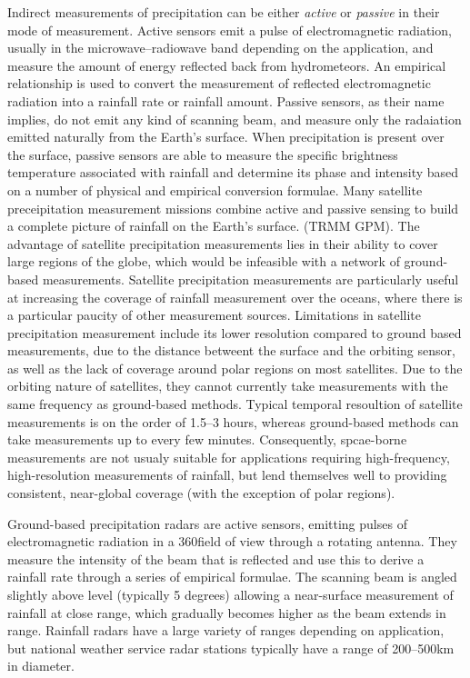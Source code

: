 Indirect measurements of precipitation can be either \textit{active} or \textit{passive} in their mode of measurement. Active sensors emit a pulse of electromagnetic radiation, usually in the microwave--radiowave band depending on the application, and measure the amount of energy reflected back from hydrometeors. An empirical relationship is used to convert the measurement of reflected electromagnetic radiation into a rainfall rate or rainfall amount. Passive sensors, as their name implies, do not emit any kind of scanning beam, and measure only the radaiation emitted naturally from the Earth's surface. When precipitation is present over the surface, passive sensors are able to measure the specific brightness temperature associated with rainfall and determine its phase and intensity based on a number of physical and empirical conversion formulae. Many satellite preceipitation measurement missions combine active and passive sensing to build a complete picture of rainfall on the Earth's surface. (TRMM GPM). The advantage of satellite precipitation measurements lies in their ability to cover large regions of the globe, which would be infeasible with a network of ground-based measurements. Satellite precipitation measurements are particularly useful at increasing the coverage of rainfall measurement over the oceans, where there is a particular paucity of other measurement sources. Limitations in satellite precipitation measurement include its lower resolution compared to ground based measurements, due to the distance betweent the surface and the orbiting sensor, as well as the lack of coverage around polar regions on most satellites. Due to the orbiting nature of satellites, they cannot currently take measurements with the same frequency as ground-based methods. Typical temporal resoultion of satellite measurements is on the order of 1.5--3 hours, whereas ground-based methods can take measurements up to every few minutes. Consequently, spcae-borne measurements are not usualy suitable for applications requiring high-frequency, high-resolution measurements of rainfall, but lend themselves well to providing consistent, near-global coverage (with the exception of polar regions). 

Ground-based precipitation radars are active sensors, emitting pulses of electromagnetic radiation in a 360\degree field of view through a rotating antenna. They measure the intensity of the beam that is reflected and use this to derive a rainfall rate through a series of empirical formulae. The scanning beam is angled slightly above level (typically 5 degrees) allowing a near-surface measurement of rainfall at close range, which gradually becomes higher as the beam extends in range.  Rainfall radars have a large variety of ranges depending on application, but national weather service radar stations typically have a range of 200--500km in diameter.  

